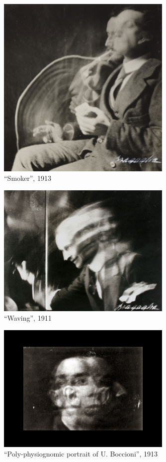 \documentclass[
  french,
]{book}
\begin{document}
\begin{figure}
\centering
\includegraphics[width=0.75\textwidth,height=\textheight]{medias/corpus/bragaglia/Anton-Giulio-Bragaglia-fotodinamica-07.jpg}
\caption{``Smoker'', 1913}
\end{figure}

\begin{figure}
\centering
\includegraphics[width=0.75\textwidth,height=\textheight]{medias/corpus/bragaglia/Anton-Giulio-Bragaglia-fotodinamica-08.jpg}
\caption{``Waving'', 1911}
\end{figure}

\begin{figure}
\centering
\includegraphics[width=0.75\textwidth,height=\textheight]{medias/corpus/bragaglia/Anton-Giulio-Bragaglia-fotodinamica-09.jpg}
\caption{``Poly-physiognomic portrait of U. Boccioni'', 1913}
\end{figure}
\end{document}
